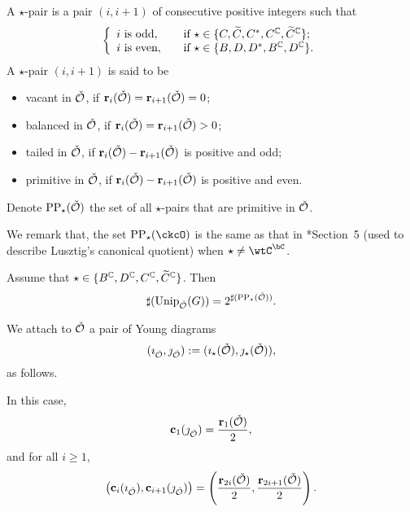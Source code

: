 \documentclass[counting_main.tex]{subfiles}
\begin{document}
\begin{defn}
  A $\star$-pair is a pair $(i,i+1)$ of consecutive positive integers such that
  \[
    \left\{
      \begin{array}{ll}
        i\textrm{ is odd}, \quad &\textrm{if $\star\in\{C, \widetilde{C}, C^*, C^{\mathbb{C}}, \widetilde C^{\mathbb{C}}\}$};  \\
        i \textrm{ is even}, \quad &\textrm{if $\star\in\{B, D, D^*, B^{\mathbb{C}}, D^{\mathbb{C}}\}$}. \\
      \end{array}
    \right.
  \]
  A $\star$-pair $(i,i+1)$ is said to be
  \begin{itemize}
    \item vacant in $\check {{\mathcal {O}}}$, if
          $\mathbf r_i(\check {{\mathcal {O}}})=\mathbf r_{i+1}(\check {{\mathcal {O}}})=0$;
    \item balanced in $\check {{\mathcal {O}}}$, if
          $\mathbf r_i(\check {{\mathcal {O}}})=\mathbf r_{i+1}(\check {{\mathcal {O}}})>0$;
    \item tailed in $\check {{\mathcal {O}}}$, if
          $\mathbf r_i(\check {{\mathcal {O}}})-\mathbf r_{i+1}(\check {{\mathcal {O}}})$ is positive and
          odd;
    \item primitive in $\check {{\mathcal {O}}}$, if
          $\mathbf r_i(\check {{\mathcal {O}}})-\mathbf r_{i+1}(\check {{\mathcal {O}}})$ is positive and
          even.
  \end{itemize}
  Denote $\mathrm{PP}_\star(\check {{\mathcal {O}}})$ the set of all $\star$-pairs that are
  primitive in $\check {{\mathcal {O}}}$.
\end{defn}
We remark that, the set $\CPP_{\star}(\ckcO)$ is the same as that in
\cite{So}*{Section~5} (used to describe Lusztig's canonical quotient) when
$\star\neq \wtC^{\bC}$.


\begin{thm}\label{complex}
  Assume that $\star\in \{B^{\mathbb{C}},D^{\mathbb{C}}, C^{\mathbb{C}}, \widetilde C^{\mathbb{C}}\}$. Then
  \[
    \sharp(\mathrm{Unip}_{\check {{\mathcal {O}}}}(G))=2^{\sharp(\mathrm{PP}_\star(\check {{\mathcal {O}}}))} .
  \]
\end{thm}


We attach to $\check {{\mathcal {O}}}$ a pair of Young diagrams
\[
  (\imath_{\check {{\mathcal {O}}}}, \jmath_{\check {{\mathcal {O}}}}):=(\imath_\star(\check {{\mathcal {O}}}), \jmath_\star(\check {{\mathcal {O}}})),
\]
as follows.

\medskip

 In this case,
\[
  \mathbf c_{1}(\jmath_{\check {{\mathcal {O}}}})=\frac{\mathbf r_1(\check {{\mathcal {O}}})}{2},
\]
and for all $i\geq 1$,
\[
  \left (\mathbf c_{i}(\imath_{\check {{\mathcal {O}}}}), \mathbf c_{i+1}(\jmath_{\check {{\mathcal {O}}}})\right )= \left (\frac{\mathbf r_{2i}(\check {{\mathcal {O}}})}{2}, \frac{\mathbf r_{2i+1}(\check {{\mathcal {O}}})}{2}\right ).
\]
\end{document}
